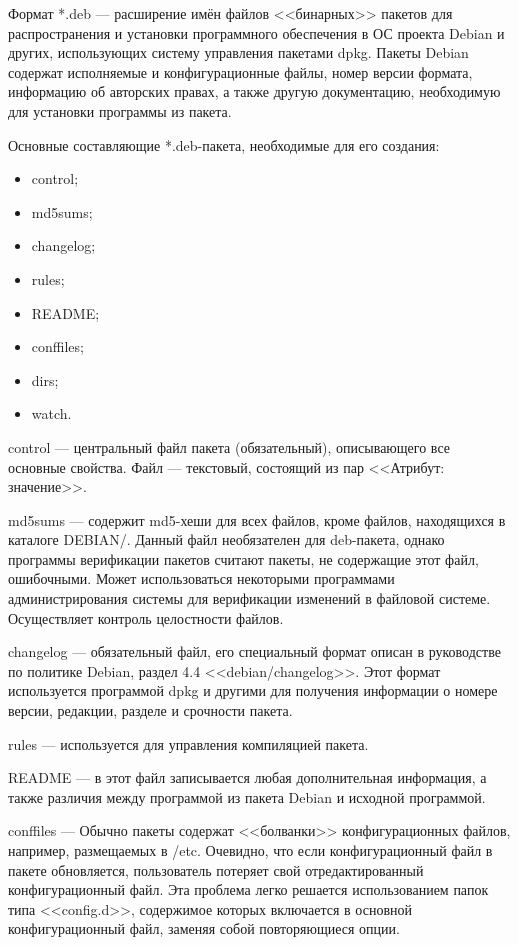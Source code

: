 Формат *.deb --- расширение имён файлов <<бинарных>> пакетов для распространения и установки программного обеспечения в ОС проекта Debian и других, использующих систему управления пакетами dpkg. Пакеты Debian содержат исполняемые и конфигурационные файлы, номер версии формата, информацию об авторских правах, а также другую документацию, необходимую для установки программы из пакета.

Основные составляющие *.deb-пакета, необходимые для его создания:
\begin{itemize}
  \item control;
  \item md5sums;
  \item changelog;
  \item rules;
  \item README;
  \item conffiles;
  \item dirs;
  \item watch.
\end{itemize}

control --- центральный файл пакета (обязательный), описывающего все основные свойства. Файл --- текстовый, состоящий из пар <<Атрибут: значение>>.~\cite{deb_man} 

md5sums --- содержит md5-хеши для всех файлов, кроме файлов, находящихся в каталоге DEBIAN/. Данный файл необязателен для deb-пакета, 
однако программы верификации пакетов считают пакеты, не содержащие этот файл, ошибочными. Может использоваться некоторыми программами администрирования системы для верификации изменений в файловой системе.~\cite{deb_package_howto} Осуществляет контроль целостности файлов.

changelog --- обязательный файл, его специальный формат описан в руководстве по политике Debian, раздел 4.4 <<debian/changelog>>. Этот формат используется программой dpkg и другими для получения информации о номере версии, редакции, разделе и срочности пакета.~\cite{deb_package_howto}

rules --- используется для управления компиляцией пакета.~\cite{deb_man} 

README --- в этот файл записывается любая дополнительная информация, а также различия между программой из пакета Debian и исходной программой.~\cite{deb_man} 

conffiles --- Обычно пакеты содержат <<болванки>> конфигурационных файлов, например, размещаемых в /etc. Очевидно, что если конфигурационный файл в пакете обновляется, пользователь потеряет свой отредактированный конфигурационный файл. Эта проблема легко решается использованием папок типа <<config.d>>, содержимое которых включается в основной конфигурационный файл, заменяя собой повторяющиеся опции.~\cite{deb_man}

